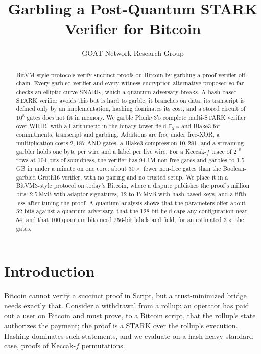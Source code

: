 \documentclass[11pt]{article}
\title{Garbling a Post-Quantum STARK Verifier for Bitcoin}
\author{GOAT Network Research Group}
\date{}
\newcommand{\F}{\mathbb{F}_{2^{128}}}
\newcommand{\AND}{\textsf{AND}}
\begin{document}
\maketitle

\begin{abstract}
BitVM-style protocols verify succinct proofs on Bitcoin by garbling a proof
verifier off-chain. Every garbled verifier and every witness-encryption
alternative proposed so far checks an elliptic-curve SNARK, which a quantum
adversary breaks. A hash-based STARK verifier avoids this but is hard to garble:
it branches on data, its transcript is defined only by an implementation,
hashing dominates its cost, and a stored circuit of $10^8$ gates does not fit in
memory. We garble Plonky3's complete multi-STARK verifier over WHIR, with all
arithmetic in the binary tower field $\F$ and Blake3 for commitments, transcript
and garbling. Additions are free under free-XOR, a multiplication costs
$2{,}187$ \AND{} gates, a Blake3 compression $10{,}281$, and a streaming garbler
holds one byte per wire and a label per live wire. For a Keccak-$f$ trace of
$2^{18}$ rows at 104 bits of soundness, the verifier has 94.1M non-free gates and
garbles to 1.5\,GB in under a minute on one core: about $30\times$ fewer
non-free gates than the Boolean-garbled Groth16 verifier, with no pairing and no
trusted setup. We place it in a BitVM3-style protocol on today's Bitcoin, where a
dispute publishes the proof's million bits: 2.5\,MvB with adaptor signatures,
12 to 17\,MvB with hash-based keys, and a fifth less after tuning the proof. A
quantum analysis shows that the parameters offer about 52 bits against a quantum
adversary, that the 128-bit field caps any configuration near 54, and that 100
quantum bits need 256-bit labels and field, for an estimated $3\times$ the gates.
\end{abstract}

\section{Introduction}

Bitcoin cannot verify a succinct proof in Script, but a trust-minimized bridge
needs exactly that. Consider a withdrawal from a rollup: an operator has paid
out a user on Bitcoin and must prove, to a Bitcoin script, that the rollup's
state authorizes the payment; the proof is a STARK over the rollup's execution.
Hashing dominates such statements, and we evaluate on a hash-heavy standard case,
proofs of Keccak-$f$ permutations.
\end{document}
